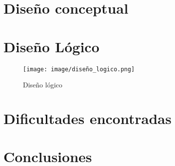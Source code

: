 \documentclass[12pt, a4paper, twoside]{article}
\begin{document}
	\section{Diseño conceptual}
	
	\section{Diseño Lógico}
	
	\begin{figure}[h!]
		\centering
		\texttt{[image: image/diseño\_logico.png]}
		\caption{Diseño lógico}
		\label{fig:11}
	\end{figure}
	
	\section{Dificultades encontradas}
	
	\section{Conclusiones}

	
	\printbibliography
	
	
	
	
\end{document}
